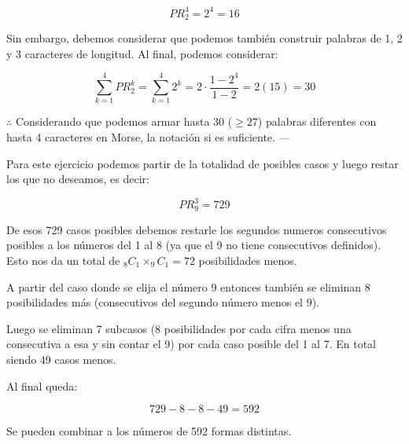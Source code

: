\documentclass{article}
\begin{document}
$$PR^{4}_{2} = 2^4 = 16$$

\bigskip

Sin embargo, debemos considerar que podemos también construir palabras de 1, 2 y 3 caracteres de longitud. Al final, podemos considerar:

$$\sum\limits^{4}_{k=1} PR^{k}_{2} = \sum\limits^{4}_{k=1} 2^k = 2 \cdot \dfrac{1 - 2^4}{1 - 2} = 2 (15) = 30$$

\bigskip

$\therefore$ Considerando que podemos armar hasta 30 ($\geq 27$) palabras diferentes con hasta 4 caracteres en Morse, la notación si es suficiente.
---

\newpage


Para este ejercicio podemos partir de la totalidad de posibles casos y luego restar los que no deseamos, es decir:

$$PR_{9}^{3} = 729$$

De esos 729 casos posibles debemos restarle los segundos numeros consecutivos posibles a los números del 1 al 8 (ya que el 9 no tiene consecutivos definidos). Esto nos da un total de $_8C_1 \times _9C_1 = 72$ posibilidades menos.

A partir del caso donde se elija el número 9 entonces también se eliminan 8 posibilidades más (consecutivos del segundo número menos el 9).

Luego se eliminan 7 subcasos (8 posibilidades por cada cifra menos una consecutiva a esa y sin contar el 9) por cada caso posible del 1 al 7. En total siendo 49 casos menos.

Al final queda:

$$729 - 8 - 8 - 49 = 592$$

Se pueden combinar a los números de 592 formas distintas.

\newpage

\bigskip

\end{document}
